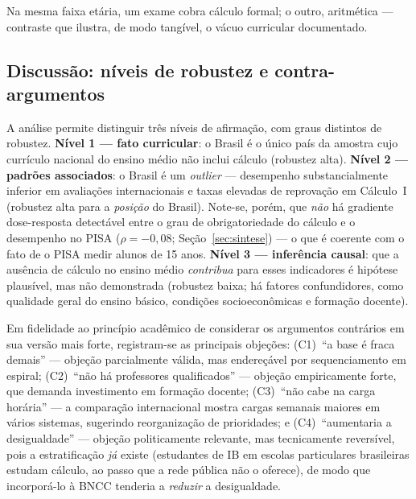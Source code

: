 \documentclass[12pt,a4paper,oneside]{article}
\begin{document}
\smallskip
\noindent{}

\smallskip
Na mesma faixa etária, um exame cobra cálculo formal; o outro, aritmética
--- contraste que ilustra, de modo tangível, o vácuo curricular documentado.

\subsection{Discussão: níveis de robustez e contra-argumentos}
\label{sec:discussao}

A análise permite distinguir três níveis de afirmação, com graus
distintos de robustez. \textbf{Nível 1 --- fato curricular}: o Brasil é o
único país da amostra cujo currículo nacional do ensino médio não inclui
cálculo (robustez alta). \textbf{Nível 2 --- padrões associados}: o Brasil
é um \emph{outlier} --- desempenho substancialmente inferior em avaliações
internacionais e taxas elevadas de reprovação em Cálculo~I (robustez alta
para a \emph{posição} do Brasil). Note-se, porém, que \emph{não} há
gradiente dose-resposta detectável entre o grau de obrigatoriedade do
cálculo e o desempenho no PISA ($\rho = -0{,}08$; Seção~\ref{sec:sintese}) ---
o que é coerente com o fato de o PISA medir alunos de 15 anos.
\textbf{Nível 3 --- inferência causal}: que a ausência de cálculo no
ensino médio \emph{contribua} para esses indicadores é hipótese plausível,
mas não demonstrada (robustez baixa; há fatores confundidores, como
qualidade geral do ensino básico, condições socioeconômicas e formação
docente).

Em fidelidade ao princípio acadêmico de considerar os argumentos
contrários em sua versão mais forte, registram-se as principais objeções:
(C1)~``a base é fraca demais'' --- objeção parcialmente válida, mas
endereçável por sequenciamento em espiral; (C2)~``não há professores
qualificados'' --- objeção empiricamente forte, que demanda investimento
em formação docente; (C3)~``não cabe na carga horária'' --- a comparação
internacional mostra cargas semanais maiores em vários sistemas,
sugerindo reorganização de prioridades; e (C4)~``aumentaria a
desigualdade'' --- objeção politicamente relevante, mas tecnicamente
reversível, pois a estratificação \emph{já} existe (estudantes de IB em
escolas particulares brasileiras estudam cálculo, ao passo que a rede
pública não o oferece), de modo que incorporá-lo à BNCC tenderia a
\emph{reduzir} a desigualdade.
\end{document}
